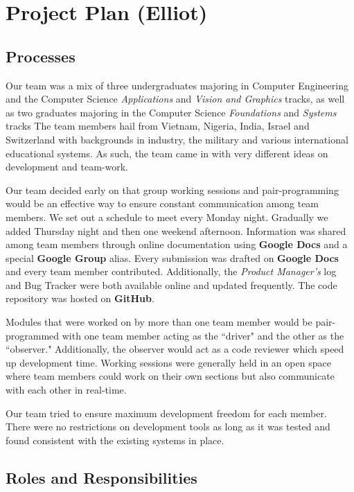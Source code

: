 \documentclass[12pt]{report}
\begin{document}
\chapter{Project Plan (Elliot)}

\section{Processes}

Our team was a mix of three undergraduates majoring in Computer Engineering and the Computer Science \textit{Applications} and \textit{Vision and Graphics} tracks, as well as two graduates majoring in the Computer Science \textit{Foundations} and \textit{Systems} tracks The team members hail from Vietnam, Nigeria, India, Israel and Switzerland with backgrounds in industry, the military and various international educational systems. As such, the team came in with very different ideas on development and team-work.

Our team decided early on that group working sessions and pair-programming would be an effective way to ensure constant communication among team members. We set out a schedule to meet every Monday night. Gradually we added Thursday night and then one weekend afternoon. Information was shared among team members through online documentation using \textbf{Google Docs} and a special \textbf{Google Group} alias. Every submission was drafted on \textbf{Google Docs} and every team member contributed. Additionally, the \textit{Product Manager's} log and Bug Tracker were both available online and updated frequently. The code repository was hosted on \textbf{GitHub}. 

Modules that were worked on by more than one team member would be pair-programmed with one team member acting as the ``driver" and the other as the ``observer." Additionally, the observer would act as a code reviewer which speed up development time. Working sessions were generally held in an open space where team members could work on their own sections but also communicate with each other in real-time.

Our team tried to ensure maximum development freedom for each member. There were no restrictions on development tools as long as it was tested and found consistent with the existing systems in place. 

\section{Roles and Responsibilities}
\end{document}
